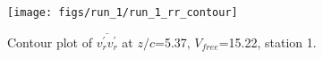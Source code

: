 \begin{figure}[H]
\centering
\texttt{[image: figs/run\_1/run\_1\_rr\_contour]}
\caption{Contour plot of $\overline{v_{r}^{\prime} v_{r}^{\prime}}$ at $z/c$=5.37, $V_{free}$=15.22, station 1.}
\label{fig:run_1_rr_contour}
\end{figure}



